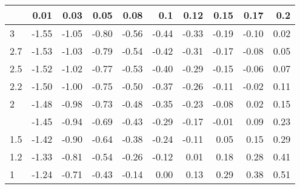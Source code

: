 
\begin{tabular}{lrrrrrrrrr}
\toprule
  & 0.01 & 0.03 & 0.05 & 0.08 & 0.1 & 0.12 & 0.15 & 0.17 & 0.2\\
\midrule
3 & -1.55 & -1.05 & -0.80 & -0.56 & -0.44 & -0.33 & -0.19 & -0.10 & 0.02\\
2.7 & -1.53 & -1.03 & -0.79 & -0.54 & -0.42 & -0.31 & -0.17 & -0.08 & 0.05\\
2.5 & -1.52 & -1.02 & -0.77 & -0.53 & -0.40 & -0.29 & -0.15 & -0.06 & 0.07\\
2.2 & -1.50 & -1.00 & -0.75 & -0.50 & -0.37 & -0.26 & -0.11 & -0.02 & 0.11\\
2 & -1.48 & -0.98 & -0.73 & -0.48 & -0.35 & -0.23 & -0.08 & 0.02 & 0.15\\
\addlinespace
1.7 & -1.45 & -0.94 & -0.69 & -0.43 & -0.29 & -0.17 & -0.01 & 0.09 & 0.23\\
1.5 & -1.42 & -0.90 & -0.64 & -0.38 & -0.24 & -0.11 & 0.05 & 0.15 & 0.29\\
1.2 & -1.33 & -0.81 & -0.54 & -0.26 & -0.12 & 0.01 & 0.18 & 0.28 & 0.41\\
1 & -1.24 & -0.71 & -0.43 & -0.14 & 0.00 & 0.13 & 0.29 & 0.38 & 0.51\\
\bottomrule
\end{tabular}
